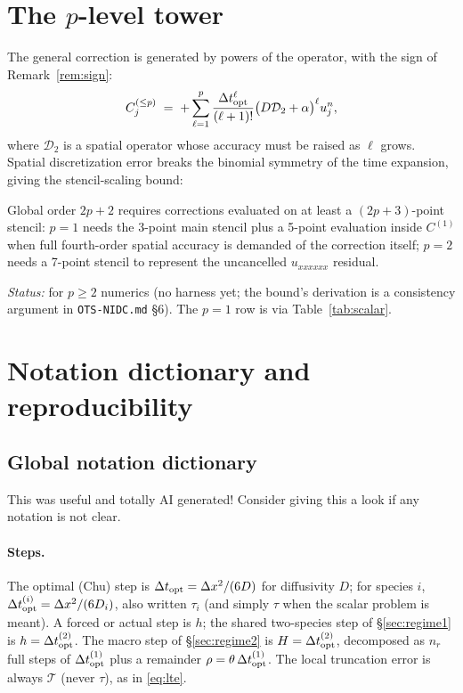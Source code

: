 \section{The $p$-level tower}

The general correction is generated by powers of the operator, with the sign of Remark~\ref{rem:sign}:
\begin{equation}\label{eq:tower} C^{(\le p)}_j \;=\; +\sum_{\ell=1}^{p} \frac{\Delta t_{\mathrm{opt}}^\ell}{(\ell+1)!}
\bigl(D\mathcal{D}_2 + \alpha\bigr)^{\ell} u^n_j,
\end{equation} where $\mathcal{D}_2$ is a spatial operator whose accuracy must be raised as $\ell$ grows. Spatial discretization error breaks the binomial symmetry of the time expansion, giving the stencil-scaling bound:

\begin{proposition}\label{prop:stencil}
Global order $2p+2$ requires corrections evaluated on at least a
$(2p+3)$-point stencil: $p=1$ needs the 3-point main stencil plus a 5-point
evaluation inside $C^{(1)}$ when full fourth-order spatial accuracy is demanded
of the correction itself; $p=2$ needs a 7-point stencil to represent the
uncancelled $u_{xxxxxx}$ residual.
\end{proposition}
\noindent\emph{Status:} \tagO for $p\ge2$ numerics (no harness yet; the bound's
derivation is a consistency argument in \texttt{OTS-NIDC.md} \S6). The $p=1$
row is \tagV via Table~\ref{tab:scalar}.

\section{Notation dictionary and reproducibility}\label{app:notation}

\subsection{Global notation dictionary}\label{app:notation-dict}

This was useful and totally AI generated! Consider giving this a look if any notation is not clear.

\paragraph{Steps.} The optimal (Chu) step is
$\Delta t_{\mathrm{opt}}=\Delta x^2/(6D)$ for diffusivity $D$; for species $i$,
$\Delta t_{\mathrm{opt}}^{(i)}=\Delta x^2/(6D_i)$, also written $\tau_i$ (and simply $\tau$ when the
scalar problem is meant). A forced or actual step is $h$; the shared two-species
step of \S\ref{sec:regime1} is $h=\Delta t_{\mathrm{opt}}^{(2)}$. The macro step of
\S\ref{sec:regime2} is $H=\Delta t_{\mathrm{opt}}^{(2)}$, decomposed as $n_r$ full steps of
$\Delta t_{\mathrm{opt}}^{(1)}$ plus a remainder $\rho=\theta\,\Delta t_{\mathrm{opt}}^{(1)}$. The local truncation
error is always $\mathcal{T}$ (never $\tau$), as in \eqref{eq:lte}.

